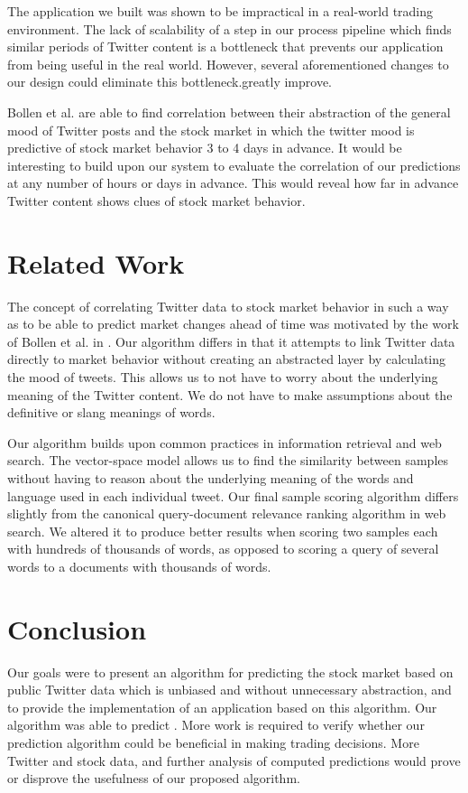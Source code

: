 \documentclass[twocolumn]{article}
\begin{document}
The application we built was shown to be impractical in a real-world trading environment. The lack of scalability of a step in our process pipeline which finds similar periods of Twitter content is a bottleneck that prevents our application from being useful in the real world. However, several aforementioned changes to our design could eliminate this bottleneck.greatly improve.

Bollen et al. are able to find correlation between their abstraction of the general mood of Twitter posts and the stock market in which the twitter mood is predictive of stock market behavior 3 to 4 days in advance. It would be interesting to build upon our system to evaluate the correlation of our predictions at any number of hours or days in advance. This would reveal how far in advance Twitter content shows clues of stock market behavior.

\section{Related Work}
The concept of correlating Twitter data to stock market behavior in such a way as to be able to predict market changes ahead of time was motivated by the work of Bollen et al. in \cite{bollen}. Our algorithm differs in that it attempts to link Twitter data directly to market behavior without creating an abstracted layer by calculating the mood of tweets. This allows us to not have to worry about the underlying meaning of the Twitter content. We do not have to make assumptions about the definitive or slang meanings of words.

Our algorithm builds upon common practices in information retrieval and web search. The vector-space model allows us to find the similarity between samples without having to reason about the underlying meaning of the words and language used in each individual tweet. Our final sample scoring algorithm differs slightly from the canonical query-document relevance ranking algorithm in web search. We altered it to produce better results when scoring two samples each with hundreds of thousands of words, as opposed to scoring a query of several words to a documents with thousands of words.

\section{Conclusion}
Our goals were to present an algorithm for predicting the stock market based on public Twitter data which is unbiased and without unnecessary abstraction, and to provide the implementation of an application based on this algorithm. Our algorithm was able to predict . More work is required to verify whether our prediction algorithm could be beneficial in making trading decisions. More Twitter and stock data, and further analysis of computed predictions would prove or disprove the usefulness of our proposed algorithm.
\end{document}
